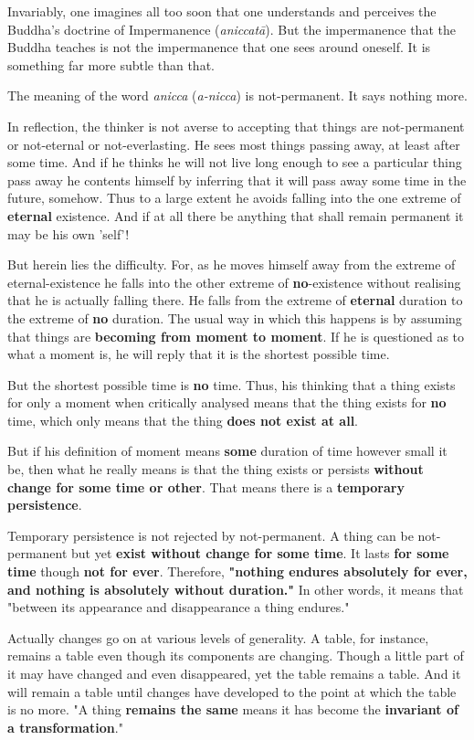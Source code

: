 Invariably, one imagines all too soon that one understands and perceives
the Buddha’s doctrine of Impermanence (\emph{aniccatā}). But the
impermanence that the Buddha teaches is not the impermanence that one
sees around oneself. It is something far more subtle than that.


The meaning of the word \emph{anicca} (\emph{a-nicca}) is not-permanent. It says
nothing more.


In reflection, the thinker is not averse to accepting that things are
not-permanent or not-eternal or not-everlasting. He sees most things
passing away, at least after some time. And if he thinks he will not
live long enough to see a particular thing pass away he contents himself
by inferring that it will pass away some time in the future, somehow.
Thus to a large extent he avoids falling into the one extreme of
\textbf{eternal} existence. And if at all there be anything that shall remain
permanent it may be his own 'self'!


But herein lies the difficulty. For, as he moves himself away from the
extreme of eternal-existence he falls into the other extreme of
\textbf{no}-existence without realising that he is actually falling there. He
falls from the extreme of \textbf{eternal} duration to the extreme of \textbf{no}
duration. The usual way in which this happens is by assuming that things
are \textbf{becoming from moment to moment}. If he is questioned as to what a
moment is, he will reply that it is the shortest possible time.


But the shortest possible time is \textbf{no} time. Thus, his thinking that a
thing exists for only a moment when critically analysed means that the
thing exists for \textbf{no} time, which only means that the thing \textbf{does not
exist at all}.


But if his definition of moment means \textbf{some} duration of time however
small it be, then what he really means is that the thing exists or
persists \textbf{without change for some time or other}. That means there is
a \textbf{temporary persistence}.


Temporary persistence is not rejected by not-permanent. A thing can be
not-permanent but yet \textbf{exist without change for some time}. It lasts
\textbf{for some time} though \textbf{not for ever}. Therefore, \textbf{"nothing endures
absolutely for ever, and nothing is absolutely without duration."} In
other words, it means that "between its appearance and disappearance a
thing endures."


Actually changes go on at various levels of generality. A table, for
instance, remains a table even though its components are changing.
Though a little part of it may have changed and even disappeared, yet
the table remains a table. And it will remain a table until changes have
developed to the point at which the table is no more. "A thing
\textbf{remains the same} means it has become the \textbf{invariant of a
transformation}."


